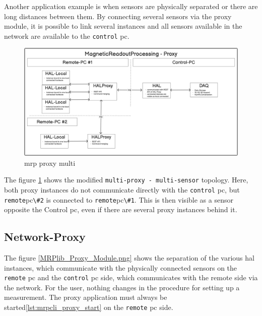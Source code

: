 Another application example is when sensors are physically separated or
there are long distances between them. By connecting several sensors via
the proxy module, it is possible to link several instances and all
sensors available in the network are available to the
\passthrough{\lstinline!control!} \gls{pc}.

\begin{figure}
\centering
\includegraphics{./generated_images/border_mrp_proxy_multi.png}
\caption{mrp proxy multi \label{mrp_proxy_multi.png}}
\end{figure}

The figure \ref{mrp_proxy_multi.png} shows the modified
\passthrough{\lstinline!multi-proxy - multi-sensor!} topology. Here,
both proxy instances do not communicate directly with the
\passthrough{\lstinline!control!} \gls{pc}, but
\passthrough{\lstinline!remote!}\gls{pc}\passthrough{\lstinline!\#2!} is
connected to
\passthrough{\lstinline!remote!}\gls{pc}\passthrough{\lstinline!\#1!}.
This is then visible as a sensor opposite the Control \gls{pc}, even if
there are several proxy instances behind it.

\hypertarget{network-proxy}{%
\subsection{Network-Proxy}\label{network-proxy}}

The figure \ref{MRPlib_Proxy_Module.png} shows the separation of the
various \gls{hal} instances, which communicate with the physically
connected sensors on the \passthrough{\lstinline!remote!} \gls{pc} and
the \passthrough{\lstinline!control!} \gls{pc} side, which communicates
with the remote side via the network. For the user, nothing changes in
the procedure for setting up a measurement. The proxy application must
always be started\ref{lst:mrpcli_proxy_start} on the
\passthrough{\lstinline!remote!} \gls{pc} side.

